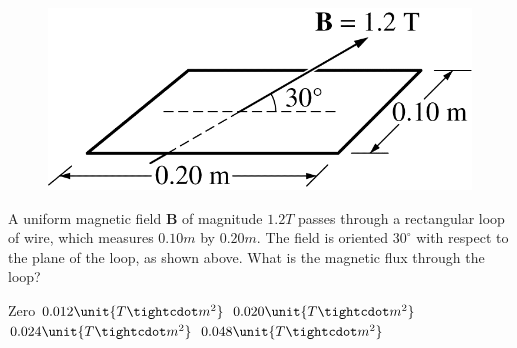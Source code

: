 \begin{figure}[H]
    \center
    \includegraphics[scale=0.25]{images/img-005-013.png}
\end{figure}

\begin{questions}\setcounter{question}{12}\question
A uniform magnetic field $\mathbf{B}$ of magnitude $1.2 \unit{T}$ passes through a rectangular loop of wire, which measures $0.10 \unit{m}$ by $0.20 \unit{m}$. The field is oriented $30^{\circ}$ with respect to the plane of the loop, as shown above. What is the magnetic flux through the loop?

\begin{oneparchoices}
\choice Zero
\choice $0.012 \unit{T \tightcdot m^2}$
\choice $0.020 \unit{T \tightcdot m^2}$
\choice $0.024 \unit{T \tightcdot m^2}$
\choice $0.048 \unit{T \tightcdot m^2}$
\end{oneparchoices}\end{questions}

